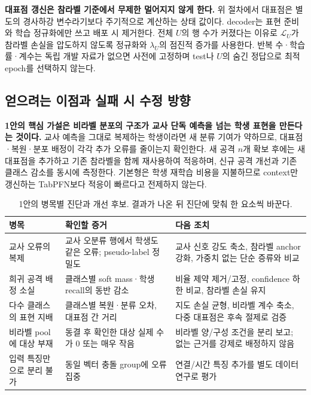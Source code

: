 \textbf{대표점 갱신은 참라벨 기준에서 무제한 멀어지지 않게 한다.} 위 절차에서 대표점은 별도의 경사하강 변수라기보다 주기적으로 계산하는 상태 값이다. decoder는 표현 준비와 학습 정규화에만 쓰고 배포 시 제거한다. 전체 $U$의 행 수가 커졌다는 이유로 $\mathcal L_U$가 참라벨 손실을 압도하지 않도록 정규화와 $\lambda_U$의 점진적 증가를 사용한다. 반복 수·학습률·계수는 독립 개발 자료가 없으면 사전에 고정하며 test나 $U$의 숨긴 정답으로 최적 epoch를 선택하지 않는다.


\subsection{얻으려는 이점과 실패 시 수정 방향}
\textbf{1안의 핵심 가설은 비라벨 분포의 구조가 교사 단독 예측을 넘는 학생 표현을 만든다는 것이다.} 교사 예측을 그대로 복제하는 학생이라면 새 분류 기여가 약하므로, 대표점·복원·분포 배정이 각각 추가 오류를 줄이는지 확인한다. 새 공격 $n$개 확보 후에는 새 대표점을 추가하고 기존 참라벨을 함께 재사용하여 적응하며, 신규 공격 개선과 기존 클래스 감소를 동시에 측정한다. 기본형은 학생 재학습 비용을 지불하므로 context만 갱신하는 TabPFN보다 적응이 빠르다고 전제하지 않는다.

\begin{table}[H]\centering\small
\caption{1안의 병목별 진단과 개선 후보. 결과가 나온 뒤 진단에 맞춰 한 요소씩 바꾼다.}
\begin{tabularx}{\linewidth}{p{.23\linewidth}YY}
\toprule
병목 & 확인할 증거 & 다음 조치\\\midrule
교사 오류의 복제 & 교사 오분류 행에서 학생도 같은 오류; pseudo-label 정밀도 & 교사 신호 강도 축소, 참라벨 anchor 강화, 가중치 없는 단순 증류와 비교\\
희귀 공격 배정 소실 & 클래스별 soft mass·학생 recall의 동반 감소 & 비율 제약 제거/고정, confidence 하한 비교, 참라벨 손실 유지\\
다수 클래스의 표현 지배 & 클래스별 복원·분류 오차, 대표점 간 거리 & 지도 손실 균형, 비라벨 계수 축소, 다중 대표점은 후속 절제로 검증\\
비라벨 pool에 대상 부재 & 동결 후 확인한 대상 실제 수가 0 또는 매우 작음 & 비라벨 양/구성 조건을 분리 보고; 없는 근거를 강제로 배정하지 않음\\
입력 특징만으로 분리 불가 & 동일 벡터 충돌 group에 오류 집중 & 연결/시간 특징 추가를 별도 데이터 연구로 평가\\\bottomrule
\end{tabularx}
\end{table}

